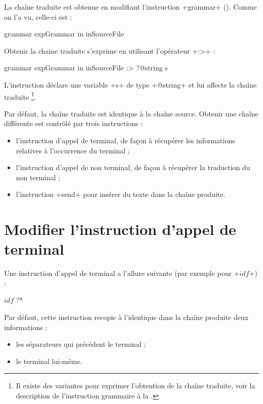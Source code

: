 
La chaîne traduite est obtenue en modifiant l'instruction \ggs+grammar+ (). Comme on l'a vu, celle-ci est : 
\begin{galgas}
grammar expGrammar in inSourceFile
\end{galgas}

Obtenir la chaine traduite s'exprime en utilisant l'opérateur  \ggs+:>+ :
\begin{galgas}
grammar expGrammar in inSourceFile :> ?@string s
\end{galgas}

L'instruction déclare une variable \ggs+s+ de type \ggs+@string+ et lui affecte la chaîne traduite \footnote{Il existe des variantes pour exprimer l'obtention de la chaîne traduite, voir la description de l'instruction grammaire à la .}.

Par défaut, la chaîne traduite est identique à la chaîne source. Obtenir une chaîne différente est contrôlé par trois instructions :
\begin{itemize}
  \item l'instruction d'appel de terminal, de façon à récupérer les informations relatives à l'occurrence du terminal ;
  \item l'instruction d'appel de non terminal, de façon à récupérer la traduction du non terminal ;
  \item l'instruction \ggs+send+ pour insérer du texte dans la chaîne produite.
\end{itemize}







\section{Modifier l'instruction d'appel de terminal}

Une instruction d'appel de terminal a l'allure suivante (par exemple pour \ggs+$idf$+) :
\begin{galgas}
$idf$ ?*
\end{galgas}

Par défaut, cette instruction recopie à l'identique dans la chaîne produite deux informations :
\begin{itemize}
  \item les séparateurs qui précèdent le terminal ;
  \item le terminal lui-même.
\end{itemize}

